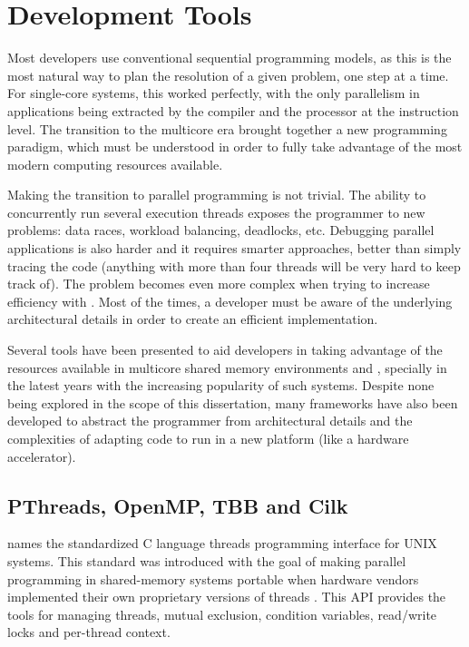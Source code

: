 \documentclass[../thesis]{subfiles}
\begin{document}
		\section{Development Tools}
		\label{sec:techbg:tools}

		Most developers use conventional sequential programming models, as this is the most natural way to plan the resolution of a given problem, one step at a time. For single-core systems, this worked perfectly, with the only parallelism in applications being extracted by the compiler and the processor at the instruction level. The transition to the multicore era brought together a new programming paradigm, which must be understood in order to fully take advantage of the most modern computing resources available.

		Making the transition to parallel programming is not trivial. The ability to concurrently run several execution threads exposes the programmer to new problems: data races, workload balancing, deadlocks, etc. Debugging parallel applications is also harder and it requires smarter approaches, better than simply tracing the code (anything with more than four threads will be very hard to keep track of). The problem becomes even more complex when trying to increase efficiency with \hetplats. Most of the times, a developer must be aware of the underlying architectural details in order to create an efficient implementation.

		Several tools have been presented to aid developers in taking advantage of the resources available in multicore shared memory environments and \hetplats, specially in the latest years with the increasing popularity of such systems. Despite none being explored in the scope of this dissertation, many frameworks have also been developed to abstract the programmer from architectural details and the complexities of adapting code to run in a new platform (like a hardware accelerator).

		\subsection{PThreads, OpenMP, TBB and Cilk}

		\pthreads names the standardized C language threads programming interface for UNIX systems. This standard was introduced with the goal of making parallel programming in shared-memory systems portable when hardware vendors implemented their own proprietary versions of threads \cite{LLNL:Barney:pthreads}. This API provides the tools for managing threads, mutual exclusion, condition variables, read/write locks and per-thread context.
\end{document}
